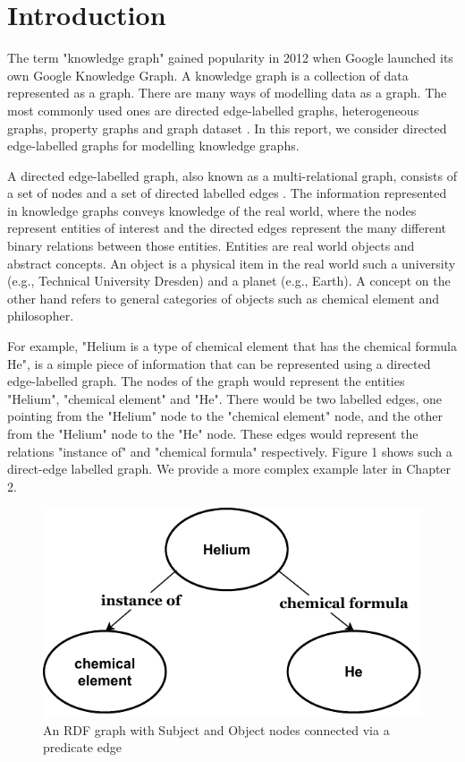 \chapter{Introduction}

The term "knowledge graph" gained popularity in 2012 when Google launched its own Google Knowledge Graph. A knowledge graph is a collection of data represented as a graph. There are many ways of modelling data as a graph. The most commonly used ones are directed edge-labelled graphs, heterogeneous graphs, property graphs and graph dataset \cite{Hogan2021}. In this report, we consider directed edge-labelled graphs for modelling knowledge graphs.

A directed edge-labelled graph, also known as a multi-relational graph, consists of a set of nodes and a set of directed labelled edges \cite{Hogan2021}. The information represented in knowledge graphs conveys knowledge of the real world, where the nodes represent entities of interest and the directed edges represent the many different binary relations between those entities. Entities are real world objects and abstract concepts. An object is a physical item in the real world such a university (e.g., Technical University Dresden) and a planet (e.g., Earth). A concept on the other hand refers to general categories of objects such as chemical element and philosopher. 

For example, "Helium is a type of chemical element that has the chemical formula He", 
is a simple piece of information that can be represented using a directed edge-labelled graph. The nodes of the graph would represent the entities "Helium", "chemical element" and "He". There would be two labelled edges, one pointing from the "Helium" node to the "chemical element" node, and the other from the "Helium" node to the "He" node. These edges would represent the relations "instance of" and "chemical formula" respectively. Figure 1 shows such a direct-edge labelled graph. We provide a more complex example later in Chapter 2.

\begin{figure}[h]
  \centering
  \includegraphics[width=0.75 \linewidth]{images/knowledge_graph.drawio.pdf}
  \caption{An RDF graph with Subject and Object nodes connected via a predicate edge}
  \label{fig:figure 1}
\end{figure}

